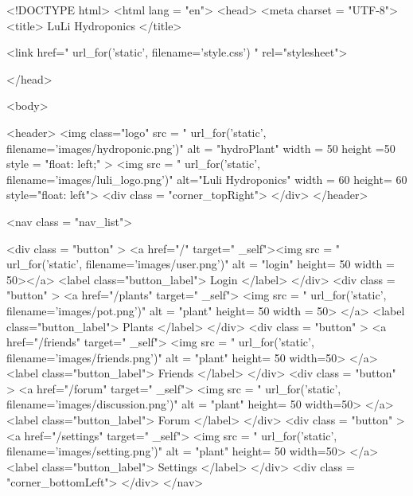 \documentclass[12pt]{article} %
\begin{document}
    \begin{htmlcode}[caption={Friends Page HTML}]
    
    <!DOCTYPE html>
    <html lang = "en">
    <head>
    <meta charset = "UTF-8">
    <title> LuLi Hydroponics </title>
    
    <link href="{{ url_for('static', filename='style.css') }}" rel="stylesheet">
    
    </head>
    
    <body>
     
       <header>
          <img class="logo" src = "{{ url_for('static', filename='images/hydroponic.png')}}" alt = "hydroPlant"  width = 50 height =50 style = "float: left;" >   
          <img src = "{{ url_for('static', filename='images/luli_logo.png')}}" alt="Luli Hydroponics" width = 60 height= 60 style="float: left">
          <div class = "corner_topRight"> </div>
       </header>
    
       <nav class = "nav_list">
          
          <div class = "button" > 
             <a href="/" target=" _self"><img src = "{{ url_for('static', filename='images/user.png')}}" alt = "login" height= 50 width = 50></a>
             <label class="button_label"> Login </label> 
          </div>
          <div class = "button" > 
             <a href="/plants" target=" _self"> <img src = "{{ url_for('static', filename='images/pot.png')}}" alt = "plant" height= 50 width = 50> </a>
             <label class="button_label"> Plants </label> 
          </div>
          <div class = "button" > 
             <a href="/friends" target=" _self"> <img src = "{{ url_for('static', filename='images/friends.png')}}" alt = "plant" height= 50 width=50> </a>
             <label class="button_label"> Friends </label> 
          </div>
          <div class = "button" > 
             <a href="/forum" target=" _self"> <img src = "{{ url_for('static', filename='images/discussion.png')}}" alt = "plant" height= 50 width=50> </a>
             <label class="button_label"> Forum </label> 
          </div>
          <div class = "button" > 
             <a href="/settings" target=" _self"> <img src = "{{ url_for('static', filename='images/setting.png')}}" alt = "plant" height= 50 width=50> </a>
             <label class="button_label"> Settings </label> 
          </div>
             <div class = "corner_bottomLeft"> </div>
         </nav>
         

\end{htmlcode}
\end{document}
